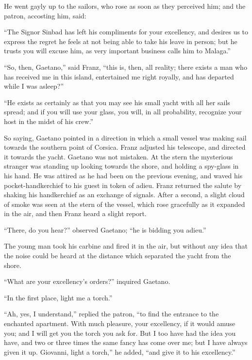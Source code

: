 He went gayly up to the sailors, who rose as soon as they perceived
him; and the patron, accosting him, said:

“The Signor Sinbad has left his compliments for your excellency, and
desires us to express the regret he feels at not being able to take his
leave in person; but he trusts you will excuse him, as very important
business calls him to Malaga.”

“So, then, Gaetano,” said Franz, “this is, then, all reality; there
exists a man who has received me in this island, entertained me right
royally, and has departed while I was asleep?”

“He exists as certainly as that you may see his small yacht with all
her sails spread; and if you will use your glass, you will, in all
probability, recognize your host in the midst of his crew.”

So saying, Gaetano pointed in a direction in which a small vessel was
making sail towards the southern point of Corsica. Franz adjusted his
telescope, and directed it towards the yacht. Gaetano was not mistaken.
At the stern the mysterious stranger was standing up looking towards
the shore, and holding a spy-glass in his hand. He was attired as he
had been on the previous evening, and waved his pocket-handkerchief to
his guest in token of adieu. Franz returned the salute by shaking his
handkerchief as an exchange of signals. After a second, a slight cloud
of smoke was seen at the stern of the vessel, which rose gracefully as
it expanded in the air, and then Franz heard a slight report.

“There, do you hear?” observed Gaetano; “he is bidding you adieu.”

The young man took his carbine and fired it in the air, but without any
idea that the noise could be heard at the distance which separated the
yacht from the shore.

“What are your excellency’s orders?” inquired Gaetano.

“In the first place, light me a torch.”

“Ah, yes, I understand,” replied the patron, “to find the entrance to
the enchanted apartment. With much pleasure, your excellency, if it
would amuse you; and I will get you the torch you ask for. But I too
have had the idea you have, and two or three times the same fancy has
come over me; but I have always given it up. Giovanni, light a torch,”
he added, “and give it to his excellency.”

